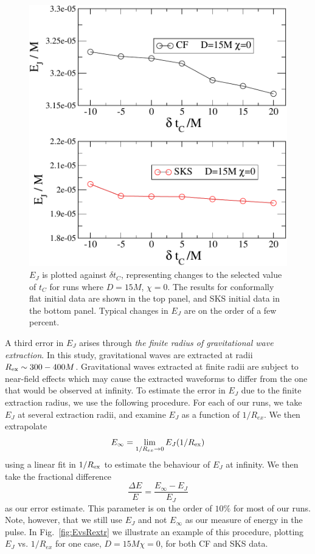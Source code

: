 \begin{figure}
 \includegraphics[width=0.95\columnwidth]{chap5/EvsDtj}
  \caption{$E_J$ is plotted against $\delta t_C$, representing changes
    to the selected value of $t_C$ for runs where $D=15M$,
    $\chi=0$. The results for conformally flat initial data are shown
    in the top panel, and SKS initial data in the bottom
    panel. Typical changes in $E_J$ are on the order of a few
    percent.}
 \label{fig:EvsDtC}
\end{figure}


A third error in $E_J$ arises through {\em the finite radius
    of gravitational wave extraction}.  In this study, gravitational waves are extracted at radii $R_{\rm ex}\sim 300-400M$.  Gravitational waves extracted at finite radii are subject to near-field effects which may cause the extracted
waveforms to differ from the one that would be observed at
infinity.  
To estimate the error in $E_J$ due to the finite extraction radius, we
use the following procedure. For each of our runs, we take $E_J$ at
several extraction radii, and examine $E_J$ as a function of
$1/R_{ex}$. We then extrapolate
\begin{equation}
E_{\infty} = \lim_{1/R_{ex}\rightarrow 0}E_J(1/R_{\rm ex})
\end{equation}
using a linear fit in $1/R_{\rm ex}$ to estimate the behaviour of $E_J$ at infinity. We
then take the fractional difference
\begin{equation}
\frac{\Delta E}{E} = \frac{E_{\infty}-E_J}{E_J}
\end{equation}
as our error estimate. This parameter is on the order of $10\%$ for
most of our runs. Note, however, that we still use $E_J$ and not $E_{\infty}$ as
our measure of energy in the pulse. In Fig.~\ref{fig:EvsRextr} we illustrate an
example of this procedure, plotting $E_J$ vs. $1/R_{ex}$ for one case,
$D=15M \chi=0$, for both CF and SKS data.

